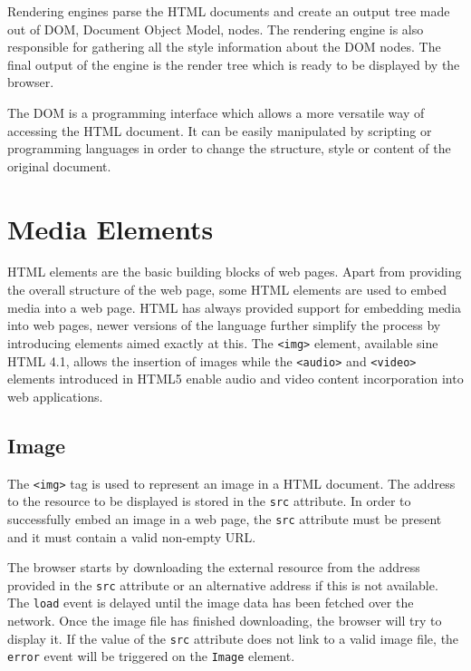 \documentclass[10pt,a4paper,twoside]{book}
\begin{document}
Rendering engines parse the HTML documents and create an output tree made out of DOM, Document Object Model, nodes. The rendering engine is also responsible for gathering all the style information about the DOM nodes. The final output of the engine is the render tree which is ready to be displayed by the browser.\cite{howbrowserswork} 

The DOM is a programming interface which allows a more versatile way of accessing the HTML document. It can be easily manipulated by scripting or programming languages in order to change the structure, style or content of the original document. \cite{dom}

\section{Media Elements}

HTML elements are the basic building blocks of web pages. Apart from providing the overall structure of the web page, some HTML elements are used to embed media into a web page. HTML has always provided support for embedding media into web pages, newer versions of the language further simplify the process by introducing elements aimed exactly at this. The \texttt{<img>} element, available sine HTML 4.1, allows the insertion of images while the \texttt{<audio>} and \texttt{<video>} elements introduced in HTML5 enable audio and video content incorporation into web applications.

\subsection{Image}

The \texttt{<img>} tag is used to represent an image in a HTML document. The address to the resource to be displayed is stored in the \texttt{src} attribute. In order to successfully embed an image in a web page, the \texttt{src} attribute must be present and it must contain a valid non-empty URL.\cite{berjon2014html}

The browser starts by downloading the external resource from the address provided in the \texttt{src} attribute or an alternative address if this is not available. The \texttt{load} event is delayed until the image data has been fetched over the network. Once the image file has finished downloading, the browser will try to display it. If the value of the \texttt{src} attribute does not link to a valid image file, the \texttt{error} event will be triggered on the \texttt{Image} element. \cite{berjon2014html}
\end{document}
